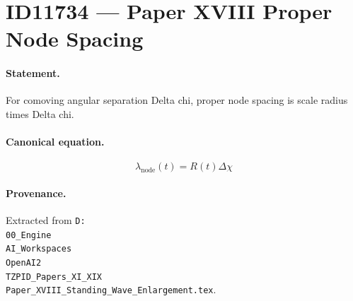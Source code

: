 \section*{ID11734 --- Paper XVIII Proper Node Spacing}

\paragraph{Statement.}
For comoving angular separation Delta chi, proper node spacing is scale radius times Delta chi.

\paragraph{Canonical equation.}
\[
\lambda_{\mathrm{node}}(t)=R(t)\Delta\chi
\]

\paragraph{Provenance.}
Extracted from \texttt{D:\\00\_Engine\\AI\_Workspaces\\OpenAI2\\TZPID\_Papers\_XI\_XIX\\Paper\_XVIII\_Standing\_Wave\_Enlargement.tex}.
